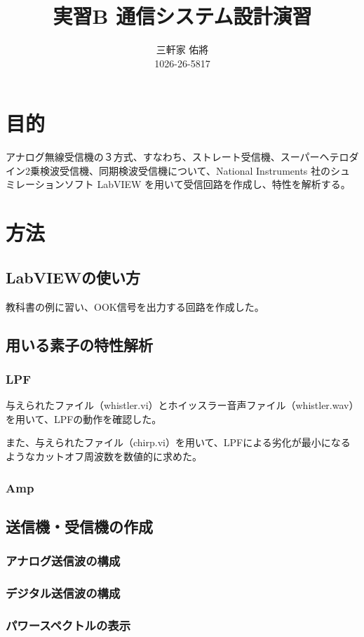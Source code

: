 \documentclass[11pt]{ltjsarticle}
\title{実習B 通信システム設計演習}
\author{三軒家 佑將 \\ 1026-26-5817}
\date{}
\begin{document}
\maketitle

\section{目的}
	アナログ無線受信機の３方式、すなわち、ストレート受信機、スーパーヘテロダイン2乗検波受信機、同期検波受信機について、National Instruments 社のシュミレーションソフト LabVIEW を用いて受信回路を作成し、特性を解析する。
\section{方法}
	\subsection{LabVIEWの使い方}
		教科書の例に習い、OOK信号を出力する回路を作成した。
	\subsection{用いる素子の特性解析}
		\subsubsection{LPF}
			与えられたファイル（whistler.vi）とホイッスラー音声ファイル（whistler.wav）を用いて、LPFの動作を確認した。
			
			また、与えられたファイル（chirp.vi）を用いて、LPFによる劣化が最小になるようなカットオフ周波数を数値的に求めた。

		\subsubsection{Amp}
			
	\subsection{送信機・受信機の作成}
		\subsubsection{アナログ送信波の構成}
		\subsubsection{デジタル送信波の構成}
		\subsubsection{パワースペクトルの表示}
\end{document}
